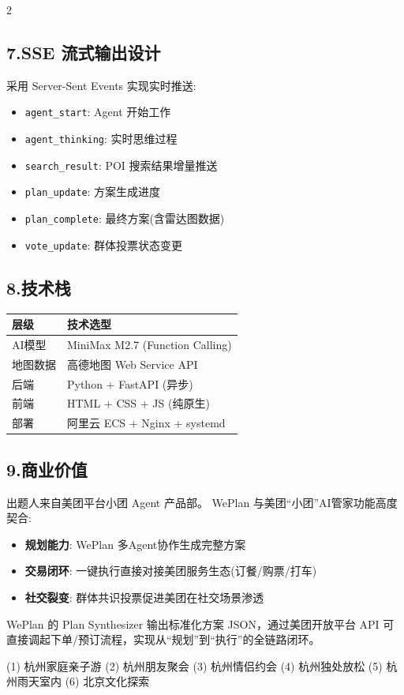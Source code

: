 \documentclass[10pt,a4paper]{ctexart}
\begin{document}
\begin{multicols}{2}
\subsection*{\color{accent}7.\;SSE 流式输出设计}

采用 Server-Sent Events 实现实时推送:
\begin{itemize}
\item \texttt{agent\_start}: Agent 开始工作
\item \texttt{agent\_thinking}: 实时思维过程
\item \texttt{search\_result}: POI 搜索结果增量推送
\item \texttt{plan\_update}: 方案生成进度
\item \texttt{plan\_complete}: 最终方案(含雷达图数据)
\item \texttt{vote\_update}: 群体投票状态变更
\end{itemize}

\columnbreak

\subsection*{\color{accent}8.\;技术栈}

{\small
\begin{tabularx}{\columnwidth}{@{}l X@{}}
\toprule
\textbf{层级} & \textbf{技术选型} \\
\midrule
AI模型   & MiniMax M2.7 (Function Calling) \\
地图数据 & 高德地图 Web Service API \\
后端     & Python + FastAPI (异步) \\
前端     & HTML + CSS + JS (纯原生) \\
部署     & 阿里云 ECS + Nginx + systemd \\
\bottomrule
\end{tabularx}
}

\subsection*{\color{accent}9.\;商业价值}

出题人来自美团平台小团 Agent 产品部。
WePlan 与美团``小团''AI管家功能高度契合:
\begin{itemize}
\item \textbf{规划能力}: WePlan 多Agent协作生成完整方案
\item \textbf{交易闭环}: 一键执行直接对接美团服务生态(订餐/购票/打车)
\item \textbf{社交裂变}: 群体共识投票促进美团在社交场景渗透
\end{itemize}
WePlan 的 Plan Synthesizer 输出标准化方案 JSON，通过美团开放平台 API 可直接调起下单/预订流程，实现从``规划''到``执行''的全链路闭环。

\vspace{6pt}
\begin{tcolorbox}[colframe=primary,colback=primary!5,title=预建Demo场景]
{\small
(1) 杭州家庭亲子游\quad
(2) 杭州朋友聚会\quad
(3) 杭州情侣约会\quad
(4) 杭州独处放松\quad
(5) 杭州雨天室内\quad
(6) 北京文化探索
}
\end{tcolorbox}

\end{multicols}
\end{document}
